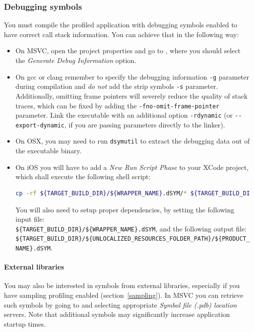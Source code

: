 \documentclass[hidelinks,titlepage,a4paper]{article}
\begin{document}
\subsubsection{Debugging symbols}

You must compile the profiled application with debugging symbols enabled to have correct call stack information. You can achieve that in the following way:

\begin{itemize}
\item On MSVC, open the project properties and go to , where you should select the \emph{Generate Debug Information} option.
\item On gcc or clang remember to specify the debugging information \texttt{-g} parameter during compilation and \emph{do not} add the strip symbols \texttt{-s} parameter. Additionally, omitting frame pointers will severely reduce the quality of stack traces, which can be fixed by adding the \texttt{-fno-omit-frame-pointer} parameter. Link the executable with an additional option \texttt{-rdynamic} (or \texttt{-{}-export-dynamic}, if you are passing parameters directly to the linker).
\item On OSX, you may need to run \texttt{dsymutil} to extract the debugging data out of the executable binary.
\item On iOS you will have to add a \emph{New Run Script Phase} to your XCode project, which shall execute the following shell script:

\begin{lstlisting}[language=sh]
cp -rf ${TARGET_BUILD_DIR}/${WRAPPER_NAME}.dSYM/* ${TARGET_BUILD_DIR}/${UNLOCALIZED_RESOURCES_FOLDER_PATH}/${PRODUCT_NAME}.dSYM
\end{lstlisting}

You will also need to setup proper dependencies, by setting the following input file:\\
\texttt{\$\{TARGET\_BUILD\_DIR\}/\$\{WRAPPER\_NAME\}.dSYM}, and the following output file:\\
\texttt{\$\{TARGET\_BUILD\_DIR\}/\$\{UNLOCALIZED\_RESOURCES\_FOLDER\_PATH\}/\$\{PRODUCT\_NAME\}.dSYM}.
\end{itemize}

\paragraph{External libraries}

You may also be interested in symbols from external libraries, especially if you have sampling profiling enabled (section~\ref{sampling}). In MSVC you can retrieve such symbols by going to  and selecting appropriate \emph{Symbol file (.pdb) location} servers. Note that additional symbols may significantly increase application startup times.
\end{document}
